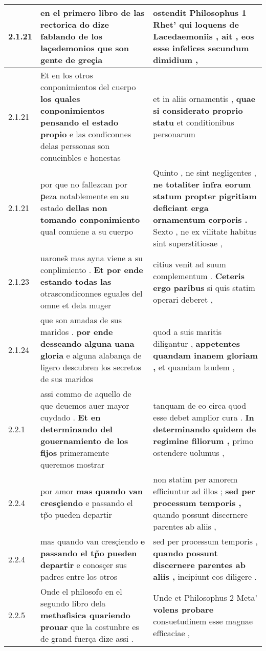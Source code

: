 \begin{tabular}{|p{1cm}|p{6.5cm}|p{6.5cm}|}
2.1.21 & en el primero libro de las rectorica \textbf{ do dize fablando de los laçedemonios } que son gente de greçia & ostendit Philosophus 1 Rhet’ \textbf{ qui loquens de Lacedaemoniis , } ait , eos esse infelices secundum dimidium , \\\hline
2.1.21 & Et en los otros conponimientos del cuerpo \textbf{ los quales conponimientos pensando el estado propio } e las condiconnes delas perssonas son conueinbles e honestas & et in aliis ornamentis , \textbf{ quae si considerato proprio statu } et conditionibus personarum \\\hline
2.1.21 & por que no fallezcan por ꝑeza notablemente en su estado \textbf{ dellas non tomando conponimiento } qual conuiene a su cuerpo & Quinto , ne sint negligentes , \textbf{ ne totaliter infra eorum statum propter pigritiam deficiant erga ornamentum corporis . } Sexto , ne ex vilitate habitus sint superstitiosae , \\\hline
2.1.23 & uarones̃ mas ayna viene a su conplimiento . \textbf{ Et por ende estando todas las } otrascondiconnes eguales del omne et dela muger & citius venit ad suum complementum . \textbf{ Ceteris ergo paribus } si quis statim operari deberet , \\\hline
2.1.24 & que son amadas de sus maridos . \textbf{ por ende desseando alguna uana gloria } e alguna alabança de ligero descubren los secretos de sus maridos & quod a suis maritis diligantur , \textbf{ appetentes quandam inanem gloriam , } et quandam laudem , \\\hline
2.2.1 & assi commo de aquello de que deuemos auer mayor cuydado . \textbf{ Et en determinando del gouernamiento de los fijos } primeramente queremos mostrar & tanquam de eo circa quod esse debet amplior cura . \textbf{ In determinando quidem de regimine filiorum , } primo ostendere uolumus , \\\hline
2.2.4 & por amor \textbf{ mas quando van cresçiendo } e passando el tp̃o pueden departir & non statim per amorem efficiuntur ad illos ; \textbf{ sed per processum temporis , } quando possunt discernere parentes ab aliis , \\\hline
2.2.4 & mas quando van cresçiendo \textbf{ e passando el tp̃o pueden departir } e conosçer sus padres entre los otros & sed per processum temporis , \textbf{ quando possunt discernere parentes ab aliis , } incipiunt eos diligere . \\\hline
2.2.5 & Onde el philosofo en el segundo libro dela \textbf{ methafisica quariendo prouar } que la costunbre es de grand fuerça dize assi . & Unde et Philosophus 2 Meta’ \textbf{ volens probare } consuetudinem esse magnae efficaciae , \\\hline

\end{tabular}
